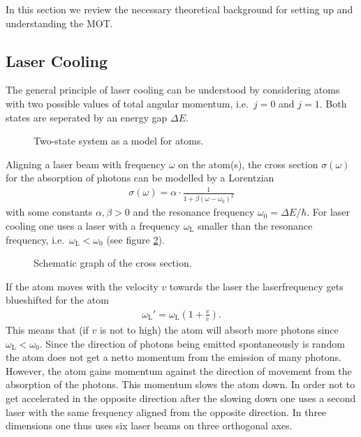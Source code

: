 In this section we review the necessary theoretical background for setting up and understanding the MOT.

\subsection{Laser Cooling}
The general principle of laser cooling can be understood by considering atoms with two possible values of total angular momentum, i.e.\ $j=0$ and $j=1$. Both states are seperated by an energy gap $\Delta E$.
\begin{figure}[h]
  \centering
  \caption{Two-state system as a model for atoms.}
  \label{fig:two_state}
\end{figure}

Aligning a laser beam with frequency $\omega$ on the atom(s), the cross section $\sigma(\omega)$ for the absorption of photons can be modelled by a Lorentzian
\begin{align*}
  \sigma(\omega) =\alpha \cdot \frac{1}{1+\beta (\omega-\omega_0)^2}
\end{align*}
with some constants $\alpha,\beta >0$ and the resonance frequency $\omega_0=\Delta E/\hbar$. For laser cooling one uses a laser with a frequency $\omega_\mathrm{L}$ smaller than the resonance frequency, i.e.\ $\omega_\mathrm{L} < \omega_0$ (see figure \ref{fig:detuning}). 
\begin{figure}[h]
  \centering
  \caption{Schematic graph of the cross section.}
  \label{fig:detuning}
\end{figure}

If the atom moves with the velocity $v$ towards the laser the laserfrequency gets blueshifted for the atom
\begin{align*}
  \omega_\mathrm{L}' = \omega_\mathrm{L} \left(1+\frac{v}{c}\right).
\end{align*}
This means that (if $v$ is not to high) the atom will absorb more photons since $\omega_\mathrm{L}<\omega_0$. Since the direction of photons being emitted spontaneously is random the atom does not get a netto momentum from the emission of many photons. However, the atom gains momentum against the direction of movement from the absorption of the photons. This momentum slows the atom down. In order not to get accelerated in the opposite direction after the slowing down one uses a second laser with the same frequency aligned from the opposite direction. In three dimensions one thus uses six laser beams on three orthogonal axes.

